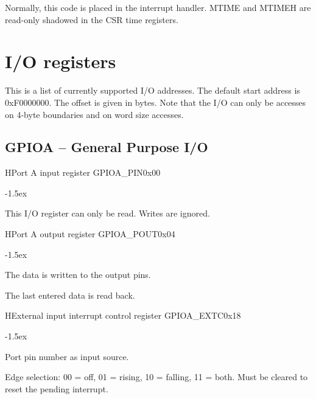 \documentclass[12pt]{article}
\begin{document}
Normally, this code is placed in the interrupt handler. MTIME and MTIMEH are read-only shadowed in the CSR time registers.

\section{I/O registers}
\label{sec:ioregisters}
This is a list of currently supported I/O addresses. 
The default start address is 0xF0000000. The offset is given in bytes. Note that the I/O can only be accesses on 4-byte boundaries and on word size accesses.

\subsection{GPIOA -- General Purpose I/O}

\begin{register}{H}{Port A input register GPIOA\_PIN}{0x00}%
\label{pinx}%
\regnewline%
\end{register}
\begin{regdesc}[0.6\textwidth]\begin{reglist}[000000]
\itemsep-1.5ex
\item[Note:] This I/O register can only be read. Writes are ignored.
\end{reglist}\end{regdesc}

\begin{register}{H}{Port A output register GPIOA\_POUT}{0x04}%
\label{poutx}%
\regnewline%
\end{register}
\begin{regdesc}[0.6\textwidth]\begin{reglist}[000000]
\itemsep-1.5ex
\item[Write] The data is written to the output pins.
\item[Read] The last entered data is read back.
\end{reglist}\end{regdesc}

\begin{register}{H}{External input interrupt control register GPIOA\_EXTC}{0x18}%
\label{extc}%
%
%
%
\regnewline%
\end{register}
\begin{regdesc}[0.7\textwidth]\begin{reglist}[000000]
\itemsep-1.5ex
\item[PIN] Port pin number as input source.
\item[EDGE] Edge selection: 00 = off, 01 = rising, 10 = falling, 11 = both. Must be cleared to reset the pending interrupt.
\end{reglist}\end{regdesc}
\end{document}
